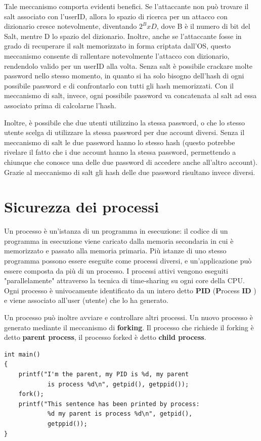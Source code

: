 Tale meccanismo comporta evidenti benefici. Se l’attaccante non può trovare il salt associato con l’userID, allora lo spazio di ricerca per un attacco con dizionario cresce notevolmente, diventando $2^{B} x D$, dove B è il numero di bit del Salt, mentre D lo spazio del dizionario. \newline
Inoltre, anche se l'attaccante fosse in grado di recuperare il salt memorizzato in forma criptata dall’OS, questo meccanismo consente di rallentare notevolmente l’attacco con dizionario, rendendolo valido per un userID alla volta. Senza salt è possibile crackare molte password nello stesso momento, in quanto si ha solo bisogno dell'hash di ogni possibile password e di confrontarlo con tutti gli hash memorizzati. Con il meccanismo di salt, invece, ogni possibile password va
concatenata al salt ad essa associato prima di calcolarne l'hash.\newline \newline

Inoltre, è possibile che due utenti utilizzino la stessa password, o che lo stesso utente scelga di utilizzare la stessa password per due account diversi. Senza il meccanismo di salt le due password hanno lo stesso hash (questo potrebbe rivelare il fatto che i due account hanno la stessa password, permettendo a chiunque che conosce una delle due password di accedere anche all’altro account). Grazie al meccanismo di salt gli hash delle due password risultano invece diversi.

\section{Sicurezza dei processi}
Un processo è un'istanza di un programma in esecuzione: il codice di un programma in esecuzione viene caricato dalla memoria secondaria in cui è memorizzato e passato alla memoria primaria. Più istanze di uno stesso programma possono essere eseguite come processi diversi, e un'applicazione può essere composta da più di un processo.  I processi attivi vengono eseguiti "parallelamente" attraverso la tecnica di time-sharing su ogni core della CPU. Ogni processo è univocamente identificato da un intero detto \textbf{PID} (\textbf{P}rocess \textbf{ID} ) e viene associato all'user (utente) che lo ha generato. \newline \newline

Un processo può inoltre avviare e controllare altri processi. Un nuovo processo è generato mediante il meccanismo di \textbf{forking}. Il processo che richiede il forking è detto \textbf{parent process}, il processo forked è detto \textbf{child process}.
\begin{algorithm}
\begin{lstlisting}[caption={Esempio forking in C}]
int main()
{
	printf("I'm the parent, my PID is %d, my parent 
			is process %d\n", getpid(), getppid());
	fork();
	printf("This sentence has been printed by process:
	 		%d my parent is process %d\n", getpid(), 
	 		getppid());
}
\end{lstlisting}
\end{algorithm}
